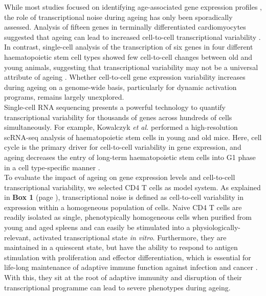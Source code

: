 While most studies focused on identifying age-associated gene expression profiles \citep{DeMagalhaes2009}, the role of transcriptional noise during ageing has only been sporadically assessed. Analysis of fifteen genes in terminally differentiated cardiomyocytes suggested that ageing can lead to increased cell-to-cell transcriptional variability \citep{Bahar2006}. In contrast, single-cell analysis of the transcription of six genes in four different haematopoietic stem cell types showed few cell-to-cell changes between old and young animals, suggesting that transcriptional variability may not be a universal attribute of ageing \citep{Warren2007}. Whether cell-to-cell gene expression variability increases during ageing on a genome-wide basis, particularly for dynamic activation programs, remains largely unexplored.\\

Single-cell RNA sequencing presents a powerful technology to quantify  transcriptional variability for thousands of genes across hundreds of cells simultaneously. For example, Kowalczyk \textit{et al.} performed a high-resolution scRNA-seq analysis of haematopoietic stem cells in young and old mice. Here, cell cycle is the primary driver for cell-to-cell variability in gene expression, and ageing decreases the entry of long-term haematopoietic stem cells into G1 phase in a cell type-specific manner \citep{Kowalczyk2015}.\\ 

To evaluate the impact of ageing on gene expression levels and cell-to-cell transcriptional variability, we selected CD4\plus{} T cells as model system. As explained in \textbf{Box 1} (page \pageref{box1}), transcriptional noise is defined as cell-to-cell variability in expression within a homogeneous population of cells. Naive CD4\plus{} T cells are readily isolated as single, phenotypically homogeneous cells when purified from young and aged spleens and can easily be stimulated into a physiologically-relevant, activated transcriptional state \emph{in vitro}. Furthermore, they are maintained in a quiescent state, but have the ability to respond to antigen stimulation with proliferation and effector differentiation, which is essential for life-long maintenance of adaptive immune function against infection and cancer \citep{Swain2012, Kim2014a}. With this, they sit at the root of adaptive immunity and disruption of their transcriptional programme can lead to severe phenotypes during ageing. \\

